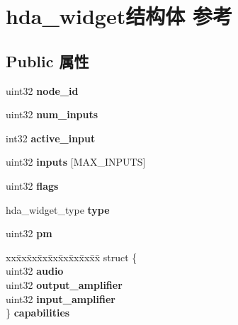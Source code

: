 \hypertarget{structhda__widget}{}\section{hda\+\_\+widget结构体 参考}
\label{structhda__widget}
\subsection*{Public 属性}
\begin{DoxyCompactItemize}
\item 
\mbox{\label{structhda__widget_a2a471b2a01402fdf29ec321cadf999bb}} 
uint32 {\bfseries node\+\_\+id}
\item 
\mbox{\label{structhda__widget_a11202a99a4107d5f10c334d280cf51f2}} 
uint32 {\bfseries num\+\_\+inputs}
\item 
\mbox{\label{structhda__widget_a8e3bec3c0abdd94cd2b0044ca3e7c6ed}} 
int32 {\bfseries active\+\_\+input}
\item 
\mbox{\label{structhda__widget_a58e84ac13642664520ce04edc8911d64}} 
uint32 {\bfseries inputs} \mbox{[}M\+A\+X\+\_\+\+I\+N\+P\+U\+TS\mbox{]}
\item 
\mbox{\label{structhda__widget_a9a1faeb8b895fcb3d3b0cca5b50507ff}} 
uint32 {\bfseries flags}
\item 
\mbox{\label{structhda__widget_a384ee3898fb947d353ae0e15ea48b163}} 
hda\+\_\+widget\+\_\+type {\bfseries type}
\item 
\mbox{\label{structhda__widget_af70f4a42b323ced7f1bc1feee3f487c0}} 
uint32 {\bfseries pm}
\item 
\mbox{\label{structhda__widget_a38df353e4d4634cac57c521f48473f35}} 
\begin{tabbing}
xx\=xx\=xx\=xx\=xx\=xx\=xx\=xx\=xx\=\kill
struct \{\\
\>uint32 {\bfseries audio}\\
\>uint32 {\bfseries output\_amplifier}\\
\>uint32 {\bfseries input\_amplifier}\\
\} {\bfseries capabilities}\\


\end{tabbing}
\end{DoxyCompactItemize}
